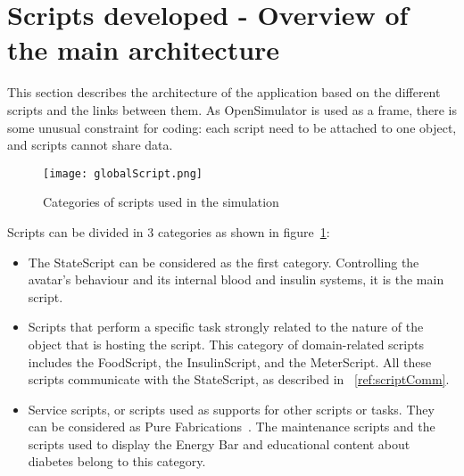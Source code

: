 

\section{Scripts developed - Overview of the main architecture}

This section describes the architecture of the application based on the different scripts and the links between them.
As OpenSimulator is used as a frame, there is some unusual constraint for coding: each script need to be attached to one object, and scripts cannot share data. \\

\begin{figure}[h!]
  \caption{Categories of scripts used in the simulation}
  \centering
  \texttt{[image: globalScript.png]}
  \label{fig:globalScript}
\end{figure}

Scripts can be divided in 3 categories as shown in figure~\ref{fig:globalScript}:
\begin{itemize}
\item The StateScript can be considered as the first category. Controlling the avatar's behaviour and its internal blood and insulin systems, it is the main script.
\item Scripts that perform a specific task strongly related to the nature of the object that is hosting the script. This category of domain-related scripts includes the FoodScript, the InsulinScript, and the MeterScript. All these scripts communicate with the StateScript, as described in ~\ref{ref:scriptComm}.
\item Service scripts, or scripts used as supports for other scripts or tasks. They can be considered as Pure Fabrications~\cite{neill2004imaging}. The maintenance scripts and the scripts used to display the Energy Bar and educational content about diabetes belong to this category.
\end{itemize}
